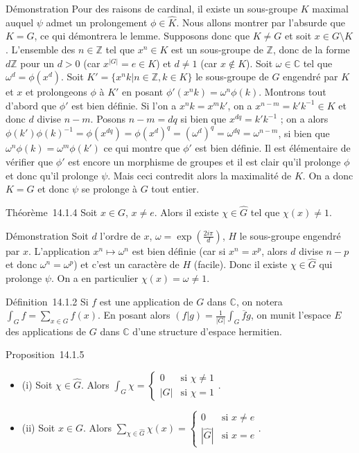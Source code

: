 Démonstration Pour des raisons de cardinal, il existe un sous-groupe $K$
maximal auquel $\psi$ admet un prolongement $\phi \in \hat{K}$.
Nous allons montrer par l'absurde que $K = G$, ce qui démontrera le lemme.
Supposons donc que $K \neq G$ et soit $x \in G \setminus K$.
L'ensemble des $n \in \mathbb{Z}$ tel que $x^n \in K$ est un sous-groupe de $\mathbb{Z}$,
donc de la forme $d\mathbb{Z}$ pour un $d > 0$ (car
$x^{|G|} = e \in K$) et
$d \neq 1$ (car $x \notin K$).
Soit $\omega \in \mathbb{C}$ tel que $\omega^d = \phi(x^d)$. Soit $K' = \{x^n k | n \in \mathbb{Z}, k \in K\}$ le sous-groupe de $G$ engendré par $K$ et $x$ et
prolongeons $\phi$ à $K'$ en posant $\phi'(x^n k) = \omega^n \phi(k)$.
Montrons tout d'abord que $\phi'$ est bien définie. Si l'on a $x^n k
= x^m k'$, on a $x^{n-m} = k' k^{-1} \in K$ et
donc $d$ divise $n - m$. Posons $n - m = dq$ si bien que $x^{dq} =
k' k^{-1}$ ; on a alors $\phi(k')\phi(k)^{-1} =
\phi(x^{dq}) = \phi(x^d)^q =
(\omega^d)^q = \omega^{dq} = \omega^{n-m}$, si
bien que $\omega^n \phi(k) = \omega^m \phi(k')$ ce qui montre que $\phi'$
est bien définie. Il est élémentaire de vérifier que $\phi'$ est encore un
morphisme de groupes et il est clair qu'il prolonge $\phi$ et donc qu'il
prolonge $\psi$. Mais ceci contredit alors la maximalité de $K$. On a donc $K =
G$ et donc $\psi$ se prolonge à $G$ tout entier.

Théorème~14.1.4 Soit $x \in G$, $x \neq e$. Alors il
existe $\chi \in \hat{G}$ tel que
$\chi(x) \neq 1$.

Démonstration Soit $d$ l'ordre de $x$, $\omega = \exp(\frac{2i\pi}{d})$, $H$ le sous-groupe engendré par $x$.
L'application $x^n \mapsto \omega^n$
est bien définie (car si $x^n = x^p$, alors $d$ divise
$n - p$ et donc $\omega^n = \omega^p$) et c'est un caractère de
$H$ (facile). Donc il existe $\chi \in \hat{G}$ qui prolonge $\psi$.
On a en particulier $\chi(x) = \omega \neq 1$.

Définition~14.1.2 Si $f$ est une application de $G$ dans $\mathbb{C}$, on notera
$\int_G f = \sum_{x \in G} f(x)$. En posant alors
$(f|g) = \frac{1}{|G|} \int_G \overline{f}g$, on munit l'espace $E$ des
applications de $G$ dans $\mathbb{C}$ d'une structure d'espace hermitien.

Proposition~14.1.5

\begin{itemize}
\itemsep1pt\parskip0pt
\item
  (i) Soit $\chi \in \hat{G}$. Alors
  $\int_G \chi = \begin{cases} 
0 & \text{si } \chi \neq 1 \\
|G| & \text{si } \chi = 1
\end{cases}$.
\item
  (ii) Soit $x \in G$. Alors
  $\sum_{\chi \in \hat{G}} \chi(x) = \begin{cases}
0 & \text{si } x \neq e \\
|\hat{G}| & \text{si } x = e
\end{cases}$.
\end{itemize}

